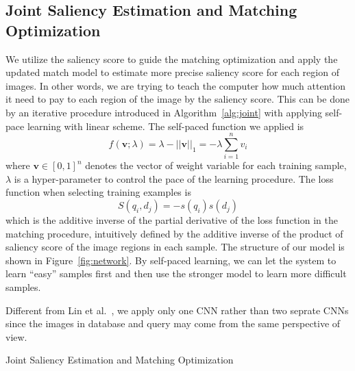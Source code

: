 \subsection{Joint Saliency Estimation and Matching Optimization}
\par
We utilize the saliency score to guide the matching optimization and apply the updated match model to estimate more precise saliency score for each region of images. In other words, we are trying to teach the computer how much attention it need to pay to each region of the image by the saliency score. This can be done by an iterative procedure introduced in Algorithm~\ref{alg:joint} with applying self-pace learning with linear scheme. The self-paced function we applied is
\begin{equation}
f(\mathbf{v};\lambda) = \lambda-||\mathbf{v}||_1 = -\lambda\sum_{i=1}^n v_i
\label{selfpacedfunc}
\end{equation}
where $\mathbf{v}\in [0,1]^n$ denotes the vector of weight variable for each training sample, $\lambda$ is a hyper-parameter to control the pace of the learning procedure. The loss function when selecting training examples is
\begin{equation}
S(q_i, d_j) = -s(q_i) s(d_j) 
\label{eq-5}
\end{equation}
which is the additive inverse of the partial derivative of the loss function in the matching procedure, intuitively defined by the additive inverse of the product of saliency score of the image regions in each sample. The structure of our model is shown in Figure~\ref{fig:network}. By self-paced learning, we can let the system to learn ``easy'' samples first and then use the stronger model to learn more difficult samples. 
\par
Different from Lin et al.~\cite{lin2015learning}, we apply only one CNN rather than two seprate CNNs since the images in database and query may come from the same perspective of view.
\par
\begin{algorithm}
\begin{algorithmic}[1]  
\ENDFOR
\end{algorithmic}
\caption{Joint Saliency Estimation and Matching Optimization}
\label{alg:joint}
\end{algorithm}

